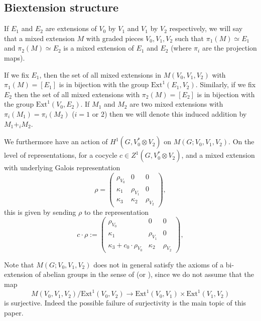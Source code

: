 \documentclass[11pt]{amsart}
\newcommand{\Ext}{\mathrm{Ext}}
\theoremstyle{plain}
\theoremstyle{definition}
\begin{document}
\subsection{Biextension structure}\label{biextensionstructure}
If $E_1 $ and $E_2 $ are extensions of $V_0 $ by $V_1 $ and $V_1 $ by $V_2 $ respectively, we will say that a mixed extension $M$ with graded pieces $V_0 ,V_1 ,V_2 $ such that $\pi _1 (M)\simeq E_1 $ and $\pi _2 (M)\simeq E_2 $ is a mixed extension of $E_1 $ and $E_2$ (where $\pi _i $ are the projection maps).

If we fix $E_1$, then the set of all mixed extensions in $M(V_0 ,V_1 ,V_2 )$ with $\pi _1 (M)= [E_1 ]$ is in bijection with the group $\Ext ^1 (E_1 ,V_2 )$. Similarly, if we fix $E_2 $ then the set of all mixed extensions with $\pi _2 (M)= [E_2 ]$ is in bijection with the group $\Ext ^1 (V_0 ,E_2 )$. If $M_1 $ and $M_2 $ are two mixed extensions with $\pi _i (M_1 )=\pi _i (M_2 )$ ($i=1$ or $2$) then we will denote this induced addition by $M_1 +_i M_2 $.

We furthermore have an action of $H^1 (G,V_0 ^* \otimes V_2 )$ on $M(G;V_0 ,V_1 ,V_2 )$. On the level of representations, for a cocycle $c \in Z^1 (G,V_0 ^* \otimes V_2 )$, and a mixed extension with underlying Galois representation
\[
\rho =\left( \begin{array}{ccc} \rho _{V_0 } & 0 & 0 \\ \kappa _1 & \rho _{V_1 }& 0 \\ \kappa _3 & \kappa _2 & \rho _{V_2 } \end{array} \right) ,
\]
this is given by sending $\rho $ to the representation
\[
c\cdot \rho :=\left( \begin{array}{ccc} \rho _{V_0 } & 0 & 0 \\ \kappa _1 & \rho _{V_1 }& 0 \\ \kappa _3 +c_0 \cdot \rho _{V_0 } & \kappa _2 & \rho _{V_2 } \end{array} \right) ,
\]

Note that $M(G;V_0 ,V_1 ,V_2 )$ does not in general satisfy the axioms of a bi-extension of abelian groups in the sense of \cite{MumBi} (or \cite{SGA7}), since we do not assume that the map
\[
M(V_0 ,V_1 ,V_2 )/\Ext ^1 (V_0 ,V_2 )\to \Ext ^1 (V_0 ,V_1 )\times \Ext ^1 (V_1 ,V_2 )
\]
is surjective. Indeed the possible failure of surjectivity is the main topic of this paper.
\end{document}
